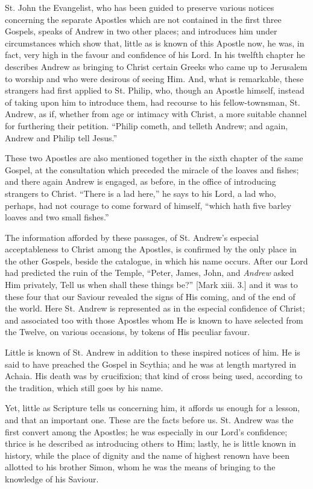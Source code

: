 St. John the Evangelist, who has been guided to preserve various
notices concerning the separate Apostles which are not contained in
the first three Gospels, speaks of Andrew in two other places; and
introduces him under circumstances which show that, little as is known
of this Apostle now, he was, in fact, very high in the favour and
confidence of his Lord. In his twelfth chapter he describes Andrew as
bringing to Christ certain Greeks who came up to Jerusalem to worship
and who were desirous of seeing Him. And, what is remarkable, these
strangers had first applied to St. Philip, who, though an Apostle
himself, instead of taking upon him to introduce them, had recourse to
his fellow-townsman, St. Andrew, as if, whether from age or intimacy
with Christ, a more suitable channel for furthering their petition.
``Philip cometh, and telleth Andrew; and again, Andrew and Philip
tell Jesus.''

These two Apostles are also mentioned together in the sixth chapter
of the same Gospel, at the consultation which preceded the miracle of
the loaves and fishes; and there again Andrew is engaged, as before,
in the office of introducing strangers to Christ. ``There is a lad
here,'' he says to his Lord, a lad who, perhaps, had not courage
to come forward of himself, ``which hath five barley loaves and two
small fishes.''

The information afforded by these passages, of St. Andrew's
especial acceptableness to Christ among the Apostles, is confirmed by
the only place in the other Gospels, beside the catalogue, in which
his name occurs. After our Lord had predicted the ruin of the Temple,
``Peter, James, John, and \emph{Andrew} asked Him privately, Tell
us when shall these things be?'' [Mark xiii. 3.] and it was to
these four that our Saviour revealed the signs of His coming, and of
the end of the world. Here St. Andrew is represented as in the
especial confidence of Christ; and associated too with those Apostles
whom He is known to have selected from the Twelve, on various
occasions, by tokens of His peculiar favour.

Little is known of St. Andrew in addition to these inspired notices
of him. He is said to have preached the Gospel in Scythia; and he was
at length martyred in Achaia. His death was by crucifixion; that kind
of cross being used, according to the tradition, which still goes by
his name.

Yet, little as Scripture tells us concerning him, it affords us
enough for a lesson, and that an important one. These are the facts
before us. St. Andrew was the first convert among the Apostles; he was
especially in our Lord's confidence; thrice is he described as
introducing others to Him; lastly, he is little known in history,
while the place of dignity and the name of highest renown have been
allotted to his brother Simon, whom he was the means of bringing to
the knowledge of his Saviour.

